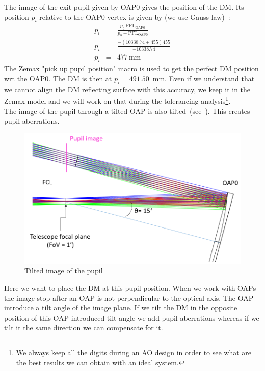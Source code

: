 \documentclass[12pt,a4paper]{article}
\begin{document}
The image of the exit pupil given by OAP0 gives the position of the DM. Its position $p_i$ relative to the OAP0 vertex is given by (we use Gauss law)~:
\begin{eqnarray}
	p_i &= &\frac{p_o\,\text{PFL}_{\text{OAP0}}}{p_o+\text{PFL}_{\text{OAP0}}}\\
	p_i &= &\frac{-(10338.74+455)455}{-10338.74}\\
	p_i &= &477\,\text{mm}
\end{eqnarray}
The Zemax "pick up pupil position" macro is used to get the perfect DM position wrt the OAP0. The DM is then at $p_i = 491.50$~mm. Even if we understand that we cannot align the DM reflecting surface with this accuracy, we keep it in the Zemax model and we will work on that during the tolerancing analysis\footnote{We always keep all the digits during an AO design in order to see what are the best results we can obtain with an ideal system.}. \\
The image of the pupil through a tilted OAP is also tilted~(see~\cite{cite:Design90degOAP}). This creates pupil aberrations.
\begin{figure}[H]
	\begin{center}
		\includegraphics[width=.7\linewidth]{images/DM_pupil_tilt.PNG}
		\caption{Tilted image of the pupil}\label{fig:DM_pupil_tilt}
	\end{center}
\end{figure}
Here we want to place the DM at this pupil position. When we work with OAPs the image stop after an OAP is not perpendicular to the optical axis. The OAP introduce a tilt angle of the image plane. If we tilt the DM in the opposite position of this OAP-introduced tilt angle we add pupil aberrations whereas if we tilt it the same direction we can compensate for it. 
\end{document}
